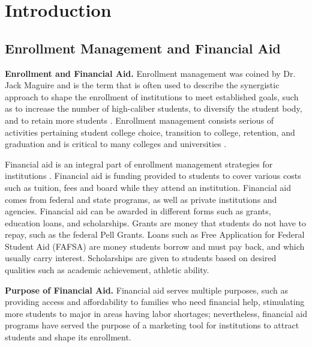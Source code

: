 \documentclass[12pt,english]{report}
\begin{document}
\newpage
\setcounter{page}{1}
\setlength{\parindent}{2em}
\chapter{Introduction}

\section{Enrollment Management and Financial Aid}

\noindent \textbf{Enrollment and Financial Aid.} Enrollment management was coined by Dr. Jack Maguire 
\citep{Maguire1976} and is the term that is often used to describe the synergistic approach to shape the 
enrollment of institutions to meet established goals, such as to increase the number of high-caliber 
students, to diversify the student body, and to retain more students \citep{Kemerer1982}. Enrollment 
management consists serious of activities pertaining student college choice, transition to college, 
retention, and graduation \citep{Hossler1990} and is critical to many colleges and universities 
\citep{Braunstein1999, Maltz2007, Aksenova2006}. 

Financial aid is an integral part of enrollment management strategies for institutions 
\citep{Dynarski2013}.  Financial aid is funding provided to students to cover various costs such as 
tuition, fees and board  while they attend an institution. Financial aid comes from federal and state 
programs, as well as private institutions and agencies. Financial aid can be awarded in different forms 
such as grants, education loans, and scholarships. Grants are money that students do not have to repay, 
such as the  federal Pell Grants. Loans such as Free Application for  Federal Student Aid (FAFSA) are money 
students borrow and  must pay back, and which usually carry interest. Scholarships are  given  to students 
based on desired qualities such as academic achievement, athletic ability. 

\vspace{0.15in}
\noindent \textbf{Purpose of Financial Aid.} Financial aid serves multiple purposes, such as providing access and affordability to families who need financial help, stimulating more students to major in areas having labor shortages; nevertheless, financial aid programs have served the purpose of a marketing tool for institutions to attract students and shape its enrollment. 
\end{document}
